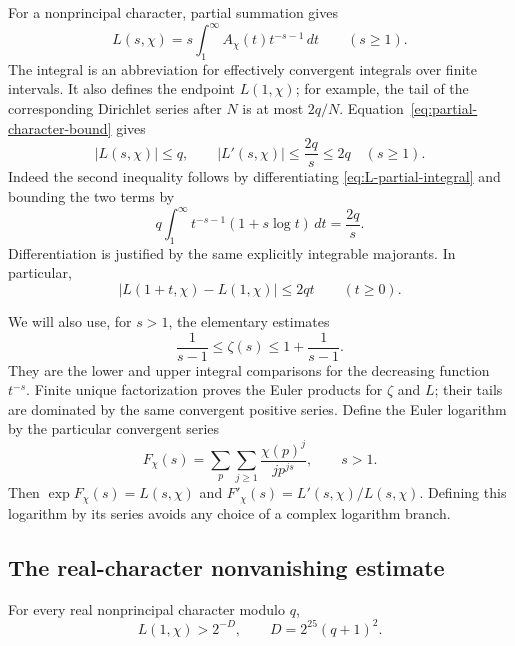 For a nonprincipal character, partial summation gives
\begin{equation}
 L(s,\chi)=s\int_1^\infty A_\chi(t)t^{-s-1}\,dt\qquad(s\geq1).
 \label{eq:L-partial-integral}
\end{equation}
The integral is an abbreviation for effectively convergent integrals over
finite intervals.  It also defines the endpoint $L(1,\chi)$; for example,
the tail of the corresponding Dirichlet series after $N$ is at most
$2q/N$.  Equation~\eqref{eq:partial-character-bound} gives
\begin{equation}
 |L(s,\chi)|\leq q,\qquad |L'(s,\chi)|\leq\frac{2q}{s}\leq2q
 \quad(s\geq1).
 \label{eq:L-basic-estimates}
\end{equation}
Indeed the second inequality follows by differentiating
\eqref{eq:L-partial-integral} and bounding the two terms by
\[
 q\int_1^\infty t^{-s-1}(1+s\log t)\,dt=\frac{2q}{s}.
\]
Differentiation is justified by the same explicitly integrable majorants.
In particular,
\begin{equation}
 |L(1+t,\chi)-L(1,\chi)|\leq2qt\qquad(t\geq0).
 \label{eq:L-lipschitz}
\end{equation}

We will also use, for $s>1$, the elementary estimates
\begin{equation}
 \frac1{s-1}\leq\zeta(s)\leq1+\frac1{s-1}.
 \label{eq:zeta-integral-test}
\end{equation}
They are the lower and upper integral comparisons for the decreasing
function $t^{-s}$.  Finite unique factorization proves the Euler products
for $\zeta$ and $L$; their tails are dominated by the same convergent
positive series.  Define the Euler logarithm by the particular convergent
series
\begin{equation}
 F_\chi(s)=\sum_p\sum_{j\geq1}\frac{\chi(p)^j}{j p^{js}},
 \qquad s>1.
 \label{eq:Euler-log}
\end{equation}
Then $\exp F_\chi(s)=L(s,\chi)$ and
$F'_\chi(s)=L'(s,\chi)/L(s,\chi)$.  Defining this logarithm by its series
avoids any choice of a complex logarithm branch.

\subsection{The real-character nonvanishing estimate}

\begin{lemma}
\label{lem:real-L-margin}
For every real nonprincipal character modulo $q$,
\[
 L(1,\chi)>2^{-D},\qquad D=2^{25}(q+1)^2.
\]
\end{lemma}

